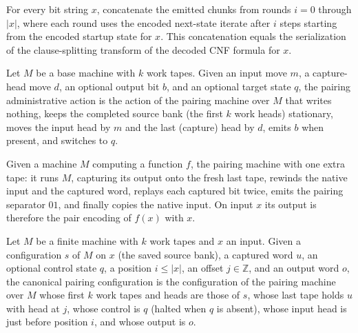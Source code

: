 \begin{lemma}
\label{Complexity.satStream_output_identity}
\leanok
{}
For every bit string $x$, concatenate the emitted chunks from rounds $i=0$ through
$|x|$, where each round uses the encoded next-state iterate after $i$ steps starting
from the encoded startup state for $x$. This concatenation equals the serialization of
the clause-splitting transform of the decoded CNF formula for $x$.
\end{lemma}
\begin{definition}
\label{Complexity.satPairAction}
\leanok
{}
Let $M$ be a base machine with $k$ work tapes. Given an input move $m$, a
capture-head move $d$, an optional output bit $b$, and an optional target state
$q$, the pairing administrative action is the action of the pairing machine over
$M$ that writes nothing, keeps the completed source bank (the first $k$ work
heads) stationary, moves the input head by $m$ and the last (capture) head by $d$,
emits $b$ when present, and switches to $q$.
\end{definition}

\begin{definition}
\label{Complexity.satPairTM}
\leanok
{}
Given a machine $M$ computing a function $f$, the pairing machine with one extra
tape: it runs $M$, capturing its output onto the fresh last tape, rewinds the
native input and the captured word, replays each captured bit twice, emits the
pairing separator $01$, and finally copies the native input. On input $x$ its
output is therefore the pair encoding of $f(x)$ with $x$.
\end{definition}

\begin{definition}
\label{Complexity.satPairCfg}
\leanok
{}
Let $M$ be a finite machine with $k$ work tapes and $x$ an input. Given a
configuration $s$ of $M$ on $x$ (the saved source bank), a captured word $u$, an
optional control state $q$, a position $i \le |x|$, an offset $j \in \mathbb{Z}$,
and an output word $o$, the canonical pairing configuration is the configuration
of the pairing machine over $M$ whose first $k$ work tapes and heads are those of
$s$, whose last tape holds $u$ with head at $j$, whose control is $q$ (halted when
$q$ is absent), whose input head is just before position $i$, and whose output is
$o$.
\end{definition}

